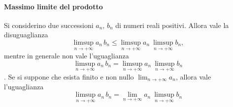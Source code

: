 \paragraph{Massimo limite del prodotto}\label{prodottolimsup}
\begin{proposition}
	Si considerino due successioni $a_n$, $b_n$ di numeri reali positivi.
	Allora vale la disuguaglianza
	\begin{equation}
		\limsup_{n\to +\infty} a_n\, b_n\leq  \limsup_{n\to +\infty} a_n\ \limsup_{n\to +\infty} b_n,
	\end{equation}	
	mentre in generale non vale l'uguaglianza 
	\begin{equation}
		 \limsup_{n\to +\infty} a_n\, b_n=  \limsup_{n\to +\infty} a_n\ \limsup_{n\to +\infty} b_n
	\end{equation}.
	Se si suppone che esista finito e non nullo $\displaystyle\lim_{n\to +\infty} a_n$, allora vale l'uguaglianza
	\begin{equation*}
		\limsup_{n\to +\infty} a_n\, b_n= \lim_{n\to +\infty} a_n\ \limsup_{n\to +\infty} b_n
	\end{equation*}
\end{proposition}
